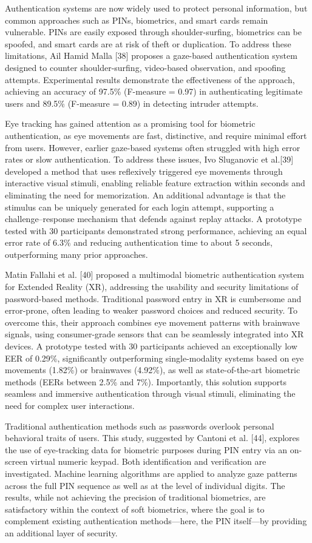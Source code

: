 \documentclass[12pt]{report}
\begin{document}
Authentication systems are now widely used to protect personal information, but common approaches such as PINs, biometrics, and smart cards remain vulnerable. 
PINs are easily exposed through shoulder-surfing, biometrics can be spoofed, and smart cards are at risk of theft or duplication. 
To address these limitations, Ail Hamid Malla [38] proposes a gaze-based authentication system designed to counter shoulder-surfing, video-based observation, and spoofing attempts.
Experimental results demonstrate the effectiveness of the approach, achieving an accuracy of 97.5\% (F-measure = 0.97) in authenticating legitimate users and 89.5\% (F-measure = 0.89) in detecting intruder attempts.

Eye tracking has gained attention as a promising tool for biometric authentication, as eye movements are fast, distinctive, and require minimal effort from users.
However, earlier gaze-based systems often struggled with high error rates or slow authentication.
To address these issues, Ivo Sluganovic et al.[39] developed a method that uses reflexively triggered eye movements through interactive visual stimuli, enabling reliable feature extraction within seconds and eliminating the need for memorization. 
An additional advantage is that the stimulus can be uniquely generated for each login attempt, supporting a challenge–response mechanism that defends against replay attacks. 
A prototype tested with 30 participants demonstrated strong performance, achieving an equal error rate of 6.3\% and reducing authentication time to about 5 seconds, outperforming many prior approaches.

Matin Fallahi et al. [40] proposed a multimodal biometric authentication system for Extended Reality (XR), addressing the usability and security limitations of password-based methods. 
Traditional password entry in XR is cumbersome and error-prone, often leading to weaker password choices and reduced security. 
To overcome this, their approach combines eye movement patterns with brainwave signals, using consumer-grade sensors that can be seamlessly integrated into XR devices.
A prototype tested with 30 participants achieved an exceptionally low EER of 0.29\%, significantly outperforming single-modality systems based on eye movements (1.82\%) or brainwaves (4.92\%), as well as state-of-the-art biometric methods (EERs between 2.5\% and 7\%).
Importantly, this solution supports seamless and immersive authentication through visual stimuli, eliminating the need for complex user interactions.

Traditional authentication methods such as passwords overlook personal behavioral traits of users.
This study, suggested by Cantoni et al. [44], explores the use of eye-tracking data for biometric purposes during PIN entry via an on-screen virtual numeric keypad.
Both identification and verification are investigated. 
Machine learning algorithms are applied to analyze gaze patterns across the full PIN sequence as well as at the level of individual digits. 
The results, while not achieving the precision of traditional biometrics, are satisfactory within the context of soft biometrics, where the goal is to complement existing authentication methods—here, the PIN itself—by providing an additional layer of security.
\end{document}
